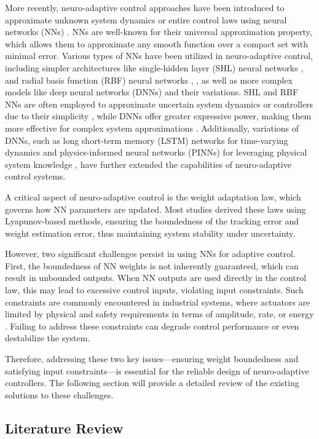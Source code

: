 \documentclass[lettersize,journal]{IEEEtran}
\begin{document}
More recently, neuro-adaptive control approaches have been introduced to approximate unknown system dynamics or entire control laws using neural networks (NNs) \cite{RN1}. NNs are well-known for their universal approximation property, which allows them to approximate any smooth function over a compact set with minimal error. Various types of NNs have been utilized in neuro-adaptive control, including simpler architectures like single-hidden layer (SHL) neural networks \cite{RN29}, \cite{RN44} and radial basis function (RBF) neural networks \cite{RN26}, \cite{RN10}, as well as more complex models like deep neural networks (DNNs) \cite{RN16} and their variations. SHL and RBF NNs are often employed to approximate uncertain system dynamics or controllers due to their simplicity \cite{RN44, RN56, RN3, RN41}, while DNNs offer greater expressive power, making them more effective for complex system approximations \cite{RN25}. Additionally, variations of DNNs, such as long short-term memory (LSTM) networks for time-varying dynamics \cite{RN14} and physics-informed neural networks (PINNs) for leveraging physical system knowledge \cite{RN15}, have further extended the capabilities of neuro-adaptive control systems.

A critical aspect of neuro-adaptive control is the weight adaptation law, which governs how NN parameters are updated. Most studies derived these laws using Lyapunov-based methods, ensuring the boundedness of the tracking error and weight estimation error, thus maintaining system stability under uncertainty.

However, two significant challenges persist in using NNs for adaptive control. First, the boundedness of NN weights is not inherently guaranteed, which can result in unbounded outputs. When NN outputs are used directly in the control law, this may lead to excessive control inputs, violating input constraints. Such constraints are commonly encountered in industrial systems, where actuators are limited by physical and safety requirements in terms of amplitude, rate, or energy \cite{RN18}. Failing to address these constraints can degrade control performance or even destabilize the system.

Therefore, addressing these two key issues—ensuring weight boundedness and satisfying input constraints—is essential for the reliable design of neuro-adaptive controllers. The following section will provide a detailed review of the existing solutions to these challenges.

\subsection{Literature Review}
\end{document}
